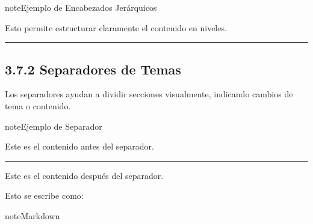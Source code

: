 \documentclass[a4paper,10pt,spanish]{sphinxmanual}
\begin{document}
\begin{sphinxadmonition}{note}{Ejemplo de Encabezados Jerárquicos}

\begin{sphinxVerbatim}[commandchars=\\\{\}]
\end{sphinxVerbatim}
\end{sphinxadmonition}

\sphinxAtStartPar
Esto permite estructurar claramente el contenido en niveles.


\bigskip\hrule\bigskip



\subsection{3.7.2 Separadores de Temas}
\label{\detokenize{3_guia_myst/organizacion_contenido:separadores-de-temas}}
\sphinxAtStartPar
Los separadores \sphinxcode{\sphinxupquote{\sphinxhyphen{}\sphinxhyphen{}\sphinxhyphen{}}} ayudan a dividir secciones visualmente, indicando cambios de tema o contenido.

\begin{sphinxadmonition}{note}{Ejemplo de Separador}

\sphinxAtStartPar
Este es el contenido antes del separador.


\bigskip\hrule\bigskip


\sphinxAtStartPar
Este es el contenido después del separador.
\end{sphinxadmonition}

\sphinxAtStartPar
Esto se escribe como:

\begin{sphinxadmonition}{note}{Markdown}

\begin{sphinxVerbatim}[commandchars=\\\{\}]
      


      
\end{sphinxVerbatim}
\end{sphinxadmonition}
\end{document}

